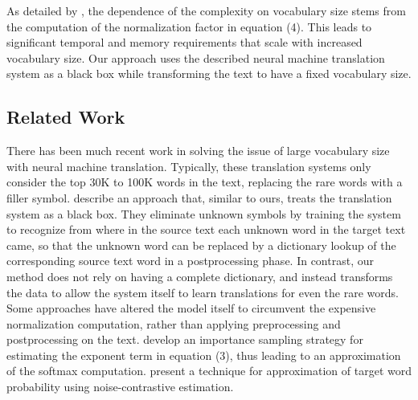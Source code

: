 As detailed by , the dependence of the complexity on vocabulary
size stems from the computation of the normalization factor in equation (4). This leads
to significant temporal and memory requirements that scale with increased vocabulary size. Our approach uses the described neural machine
translation system as a black box while transforming the text to have a fixed vocabulary size.

\subsection{Related Work}
There has been much recent work in solving the issue of large vocabulary size with neural machine translation.
Typically, these translation systems only consider the top 30K to 100K words in the text, replacing the rare words
with a filler symbol.  describe an approach
that, similar to ours, treats the translation system as a black box. They eliminate unknown symbols by training the
system to recognize from where in the source text each unknown word in the target text came, so that the unknown word
can be replaced by a dictionary lookup of the corresponding source text word in a postprocessing phase. In contrast,
our method does not rely on having a complete dictionary, and instead transforms the data to allow the system itself to
learn translations for even the rare words.\\

Some approaches have altered the model itself to circumvent the expensive normalization computation, rather than
applying preprocessing and postprocessing on the text. 
develop an importance sampling strategy for estimating the exponent term in equation (3), thus leading to
an approximation of the softmax computation. 
present a technique for approximation of target word probability using noise-contrastive estimation.